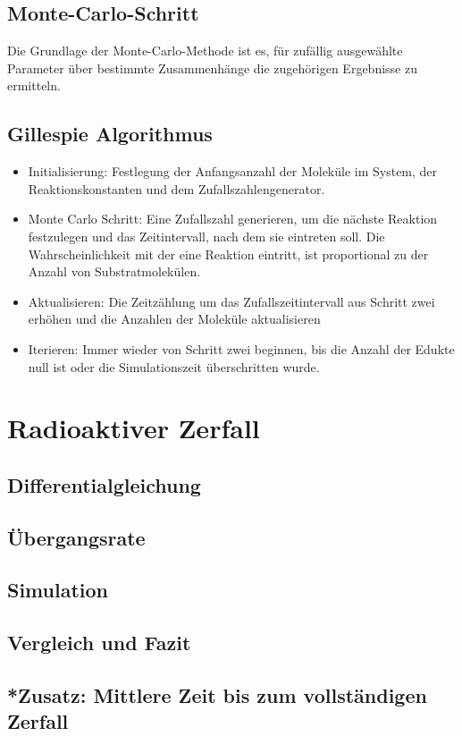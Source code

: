 \documentclass{scrartcl}
\begin{document}
 
\subsection{Monte-Carlo-Schritt}

Die Grundlage der Monte-Carlo-Methode ist es, für zufällig ausgewählte Parameter über bestimmte Zusammenhänge die zugehörigen Ergebnisse zu ermitteln.
\subsection{Gillespie Algorithmus}
\begin{itemize}
    \item{Initialisierung}: Festlegung der Anfangsanzahl der Moleküle im System, der Reaktionskonstanten und dem Zufallszahlengenerator.
\item{Monte Carlo Schritt}: Eine Zufallszahl generieren, um die nächste Reaktion festzulegen und das Zeitintervall, nach dem sie eintreten soll. Die Wahrscheinlichkeit mit der eine Reaktion eintritt, ist proportional zu der Anzahl von Substratmolekülen.
\item{Aktualisieren}: Die Zeitzählung um das Zufallszeitintervall aus Schritt zwei erhöhen und die Anzahlen der Moleküle aktualisieren
\item{Iterieren}: Immer wieder von Schritt zwei beginnen, bis die Anzahl der Edukte null ist oder die Simulationszeit überschritten wurde.
\end{itemize}

\section{Radioaktiver Zerfall}
\subsection{Differentialgleichung}
\subsection{Übergangsrate}
\subsection{Simulation}
\subsection{Vergleich und Fazit}
\subsection{*Zusatz: Mittlere Zeit bis zum vollständigen Zerfall}
\end{document}
